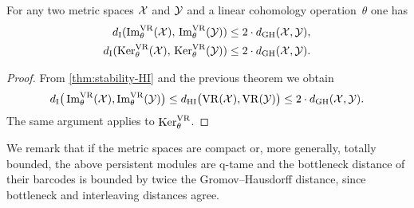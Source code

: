\medskip\corollary For any two metric spaces $\mathcal{X}$ and $\mathcal{Y}$ and a linear cohomology operation~$\theta$ one has
\begin{align*}
	d_{\mathrm{I}}(\operatorname{Im}_\theta^{\mathrm{VR}}(\mathcal{X}),\, \operatorname{Im}_\theta^{\mathrm{VR}}(\mathcal{Y})) \leq 2 \cdot d_{\mathrm{GH}}(\mathcal{X},\mathcal{Y}), \\
	d_{\mathrm{I}}(\operatorname{Ker}_\theta^{\mathrm{VR}}(\mathcal{X}),\, \operatorname{Ker}_\theta^{\mathrm{VR}}(\mathcal{Y})) \leq 2 \cdot d_{\mathrm{GH}}(\mathcal{X},\mathcal{Y}).
\end{align*}

\begin{proof}
	From \cref{thm:stability-HI} and the previous theorem we obtain
	\[
	d_{\mathrm{I}}\big(\operatorname{Im}_\theta^{\mathrm{VR}}(\mathcal{X}), \operatorname{Im}_\theta^{\mathrm{VR}}(\mathcal{Y})\big) \leq
	d_{\mathrm{HI}}\big(\mathrm{VR}(\mathcal{X}), \mathrm{VR}(\mathcal{Y})\big) \leq 2 \cdot d_{\mathrm{GH}}(\mathcal{X},\mathcal{Y}).
	\]
	The same argument applies to $\operatorname{Ker}_\theta^{\mathrm{VR}}$.
\end{proof}

We remark that if the metric spaces are compact or, more generally, totally bounded, the above persistent modules are q-tame and the bottleneck distance of their barcodes is bounded by twice the Gromov--Hausdorff distance, since bottleneck and interleaving distances agree.